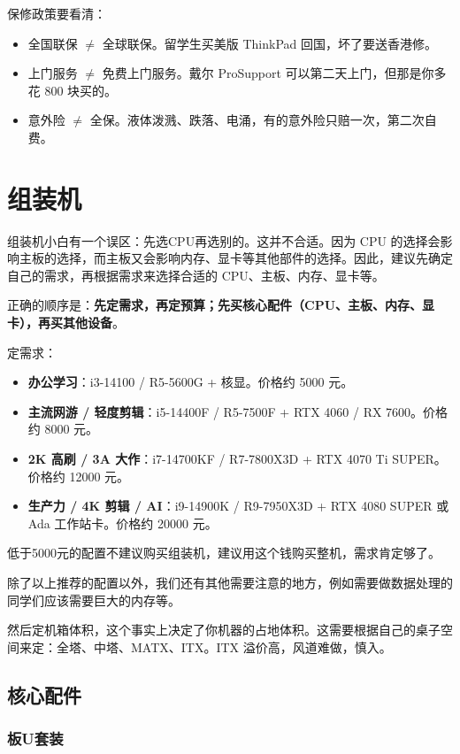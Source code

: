 \documentclass[../main.tex]{subfiles}
\begin{document}
保修政策要看清：
\begin{itemize}
    \item 全国联保 $\neq$ 全球联保。留学生买美版 ThinkPad 回国，坏了要送香港修。
    \item 上门服务 $\neq$ 免费上门服务。戴尔 ProSupport 可以第二天上门，但那是你多花 800 块买的。
    \item 意外险 $\neq$ 全保。液体泼溅、跌落、电涌，有的意外险只赔一次，第二次自费。
\end{itemize}

\section{组装机}

组装机小白有一个误区：先选CPU再选别的。这并不合适。因为 CPU 的选择会影响主板的选择，而主板又会影响内存、显卡等其他部件的选择。因此，建议先确定自己的需求，再根据需求来选择合适的 CPU、主板、内存、显卡等。

正确的顺序是：\textbf{先定需求，再定预算；先买核心配件（CPU、主板、内存、显卡），再买其他设备}。

定需求：
\begin{itemize}
    \item \textbf{办公学习}：i3-14100 / R5-5600G + 核显。价格约 5000 元。
    \item \textbf{主流网游 / 轻度剪辑}：i5-14400F / R5-7500F + RTX 4060 / RX 7600。价格约 8000 元。
    \item \textbf{2K 高刷 / 3A 大作}：i7-14700KF / R7-7800X3D + RTX 4070 Ti SUPER。价格约 12000 元。
    \item \textbf{生产力 / 4K 剪辑 / AI}：i9-14900K / R9-7950X3D + RTX 4080 SUPER 或 Ada 工作站卡。价格约 20000 元。
\end{itemize}

低于5000元的配置不建议购买组装机，建议用这个钱购买整机，需求肯定够了。

除了以上推荐的配置以外，我们还有其他需要注意的地方，例如需要做数据处理的同学们应该需要巨大的内存等。

然后定机箱体积，这个事实上决定了你机器的占地体积。这需要根据自己的桌子空间来定：全塔、中塔、MATX、ITX。ITX 溢价高，风道难做，慎入。

\subsection{核心配件}

\subsubsection{板U套装}
\end{document}
